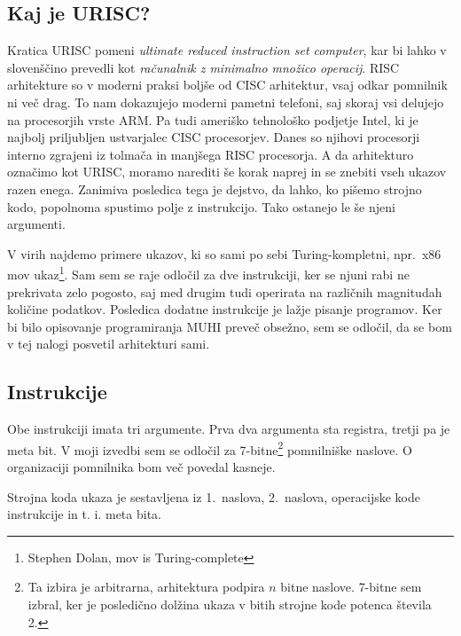 \documentclass[12pt]{article}
\begin{document}
\subsection{Kaj je URISC?}
Kratica URISC pomeni \textit{ultimate reduced instruction set computer}, kar bi lahko v slovenščino prevedli kot \textit{računalnik z minimalno množico operacij}.
RISC arhitekture so v moderni praksi boljše od CISC arhitektur, vsaj odkar pomnilnik ni več drag.
To nam dokazujejo moderni pametni telefoni, saj skoraj vsi delujejo na procesorjih vrste ARM.
Pa tudi ameriško tehnološko podjetje Intel, ki je najbolj priljubljen ustvarjalec CISC procesorjev.
Danes so njihovi procesorji interno zgrajeni iz tolmača in manjšega RISC procesorja.
A da arhitekturo označimo kot URISC, moramo narediti še korak naprej in se znebiti vseh ukazov razen enega.
Zanimiva posledica tega je dejstvo, da lahko, ko pišemo strojno kodo, popolnoma spustimo polje z instrukcijo.
Tako ostanejo le še njeni argumenti.

V virih najdemo primere ukazov, ki so sami po sebi Turing-kompletni, npr.\ x86 mov ukaz\footnote{Stephen Dolan, mov is Turing-complete}.
Sam sem se raje odločil za dve instrukciji, ker se njuni rabi ne prekrivata zelo pogosto, saj med drugim tudi operirata na različnih magnitudah količine podatkov.
Posledica dodatne instrukcije je lažje pisanje programov.
Ker bi bilo opisovanje programiranja MUHI preveč obsežno, sem se odločil, da se bom v tej nalogi posvetil arhitekturi sami.

\subsection{Instrukcije}
Obe instrukciji imata tri argumente.
Prva dva argumenta sta registra, tretji pa je meta bit.
V moji izvedbi sem se odločil za 7-bitne\footnote{Ta izbira je arbitrarna, arhitektura podpira $n$ bitne naslove. 7-bitne sem izbral, ker je posledično dolžina ukaza v bitih strojne kode potenca števila 2.} pomnilniške naslove.
O organizaciji pomnilnika bom več povedal kasneje.

Strojna koda ukaza je sestavljena iz 1.\ naslova, 2.\ naslova, operacijske kode instrukcije in t. i. meta bita.
\end{document}
